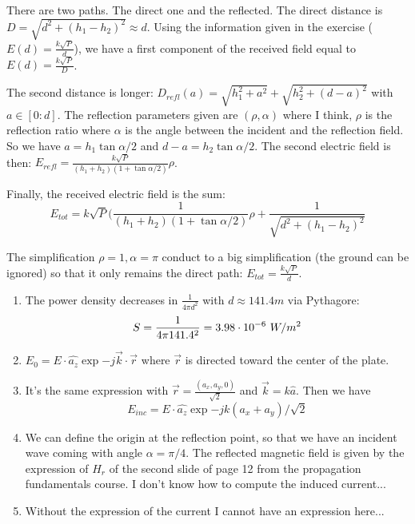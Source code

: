 
\begin{solution}
	There are two paths. The direct one and the reflected. The direct distance is $D = \sqrt{d^2 + (h_1 - h_2)^2} \approx d$. Using the information given in the exercise ($E(d) = \frac{k\sqrt{P}}{d}$), we have a first component of the received field equal to $E(d) = \frac{k\sqrt{P}}{D}$.

	
	The second distance is longer: $D_{refl}(a) = \sqrt{h_1^2 + a^2} + \sqrt{h_2^2 + (d - a)^2}$ with $a \in [0:d]$. 	
	The reflection parameters given are $(\rho, \alpha)$ where I think, $\rho$ is the reflection ratio where $\alpha$ is the angle between the incident and the reflection field. So we have $a = h_1 \tan{\alpha/2}$ and $d - a = h_2 \tan{\alpha/2}$. 
	The second electric field is then: $E_{refl} = \frac{k\sqrt{P}}{(h_1 + h_2)(1 + \tan{\alpha/2})}\rho$.
	
	
	Finally, the received electric field is the sum:
	$$E_{tot} = k\sqrt{P} (\frac{1}{(h_1 + h_2)(1 + \tan{\alpha/2})}\rho + \frac{1}{\sqrt{d^2 + (h_1 - h_2)^2}}$$

	
	The simplification $\rho = 1, \alpha = \pi$ conduct to a big simplification (the ground can be ignored) so that it only remains the direct path: $E_{tot} = \frac{k\sqrt{P}}{d}$.
\end{solution}

\begin{solution}
	\begin{enumerate}
		\item The power density decreases in $\frac{1}{4\pi d^2}$ with $d \approx 141.4m$ via Pythagore:
			  $$ S = \frac{1}{4\pi 141.4^2} = 3.98\cdot 10^{-6}~W/m^2 $$
		\item $E_0 = E \cdot \hat{a_z} \exp{-j\vec{k} \cdot \vec{r}}$ where $\vec{r}$ is directed toward the center of the plate.
		\item It's the same expression with $\vec{r} = \frac{(a_x, a_y, 0)}{\sqrt{2}}$ and $\vec{k} = k \hat{a}$. Then we have 
			  $$E_{inc} = E \cdot \hat{a_z} \exp{-j k (a_x + a_y)/\sqrt{2}}$$ 

			  \notsure
			  
		\item We can define the origin at the reflection point, so that we have an incident wave coming with angle $\alpha = \pi/4$. The reflected magnetic field is given by the expression of $H_r$ of the second slide of page 12 from the propagation fundamentals course.
			  \notsure I don't know how to compute the induced current...
		\item Without the expression of the current I cannot have an expression here... \notsure
	\end{enumerate}
\end{solution}

